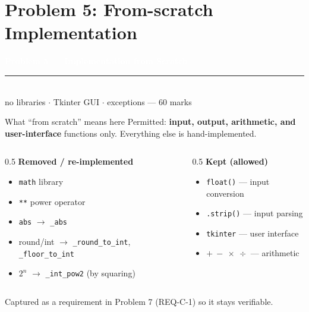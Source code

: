\documentclass[10pt,aspectratio=169]{beamer}
\begin{document}
\section{Problem 5: From-scratch Implementation}
{
\begin{frame}[plain]
  \vfill
  \begin{center}
    {\Large\bfseries\textcolor{white}{Problem 5 --- Implementation from Scratch}}\\[0.5em]
    \textcolor{mAccent}{\rule{0.4\textwidth}{1.0pt}}\\[0.5em]
    {\normalsize\textcolor{white!85!black}{no libraries $\cdot$ Tkinter GUI $\cdot$ exceptions --- 60 marks}}
  \end{center}
  \vfill
\end{frame}}

\begin{frame}{What ``from scratch'' means here}
  \small
  Permitted: \textbf{input, output, arithmetic, and user-interface} functions only. Everything else is hand-implemented.
  \vspace{0.5em}
  \begin{columns}[T]
    \begin{column}{0.5\textwidth}
      \textbf{Removed / re-implemented}
      \begin{itemize}\footnotesize\setlength\itemsep{0.2em}
        \item[\textcolor{mAccent}{$\times$}] \texttt{math} library
        \item[\textcolor{mAccent}{$\times$}] \texttt{**} power operator
        \item[\textcolor{mAccent}{$\times$}] \texttt{abs} $\to$ \texttt{\_abs}
        \item[\textcolor{mAccent}{$\times$}] round/int $\to$ \texttt{\_round\_to\_int}, \texttt{\_floor\_to\_int}
        \item[\textcolor{mAccent}{$\times$}] $2^{n}$ $\to$ \texttt{\_int\_pow2} (by squaring)
      \end{itemize}
    \end{column}
    \begin{column}{0.5\textwidth}
      \textbf{Kept (allowed)}
      \begin{itemize}\footnotesize\setlength\itemsep{0.2em}
        \item[\textcolor{green!50!black}{$\checkmark$}] \texttt{float()} --- input conversion
        \item[\textcolor{green!50!black}{$\checkmark$}] \texttt{.strip()} --- input parsing
        \item[\textcolor{green!50!black}{$\checkmark$}] \texttt{tkinter} --- user interface
        \item[\textcolor{green!50!black}{$\checkmark$}] $+\ -\ \times\ \div$ --- arithmetic
      \end{itemize}
    \end{column}
  \end{columns}
  \vspace{0.4em}
  \footnotesize\textcolor{mLightTeal}{Captured as a requirement in Problem 7 (REQ-C-1) so it stays verifiable.}
\end{frame}
\end{document}
